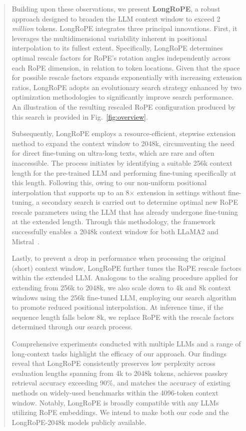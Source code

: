 \begin{abstract}
Building upon these observations, we present \textbf{LongRoPE}, a robust approach designed to broaden the LLM context window to exceed 2 \emph{million} tokens. LongRoPE integrates three principal innovations. First, it leverages the multidimensional variability inherent in positional interpolation to its fullest extent. Specifically, LongRoPE determines optimal rescale factors for RoPE’s rotation angles independently across each RoPE dimension, in relation to token locations. Given that the space for possible rescale factors expands exponentially with increasing extension ratios, LongRoPE adopts an evolutionary search strategy enhanced by two optimization methodologies to significantly improve search performance. An illustration of the resulting rescaled RoPE configuration produced by this search is provided in Fig.~\ref{fig:overview}.

Subsequently, {LongRoPE} employs a resource-efficient, stepwise extension method to expand the context window to 2048k, circumventing the need for direct fine-tuning on ultra-long texts, which are rare and often inaccessible. The process initiates by identifying a suitable 256k context length for the pre-trained LLM and performing fine-tuning specifically at this length. Following this, owing to our non-uniform positional interpolation that supports up to an 8$\times$ extension in settings without fine-tuning, a secondary search is carried out to determine optimal new RoPE rescale parameters using the LLM that has already undergone fine-tuning at the extended length. Through this methodology, the framework successfully enables a 2048k context window for both LLaMA2 and Mistral~\cite{mistral}.

Lastly, to prevent a drop in performance when processing the original (short) context window, {LongRoPE} further tunes the RoPE rescale factors within the extended LLM. Analogous to the scaling procedure applied for extending from 256k to 2048k, we also scale down to 4k and 8k context windows using the 256k fine-tuned LLM, employing our search algorithm to promote reduced positional interpolation. At inference time, if the sequence length falls below 8k, we replace RoPE with the rescale factors determined through our search process.

Comprehensive experiments conducted with multiple LLMs and a range of long-context tasks highlight the efficacy of our approach. Our findings reveal that LongRoPE consistently preserves low perplexity across evaluation lengths spanning from 4k to 2048k tokens, achieves passkey retrieval accuracy exceeding 90\%, and matches the accuracy of existing methods on widely-used benchmarks within the 4096-token context window. Notably, LongRoPE is broadly compatible with any LLMs utilizing RoPE embeddings. We intend to make both our code and the LongRoPE-2048k models publicly available.


\end{abstract}

